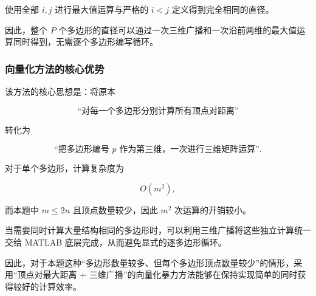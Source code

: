 使用全部 $i,j$ 进行最大值运算与严格的 $i<j$ 定义得到完全相同的直径。

因此，整个 $P$ 个多边形的直径可以通过一次三维广播和一次沿前两维的最大值运算同时得到，无需逐个多边形编写循环。

\subsubsection{向量化方法的核心优势}

该方法的核心思想是：将原本

$$
\text{“对每一个多边形分别计算所有顶点对距离”}
$$

转化为

$$
\text{“把多边形编号 }p\text{ 作为第三维，一次进行三维矩阵运算”}.
$$

对于单个多边形，计算复杂度为

\begin{equation}
O(m^2),
\end{equation}

而本题中 $m\leq2n$ 且顶点数量较少，因此 $m^2$ 次运算的开销较小。

当需要同时计算大量结构相同的多边形时，可以利用三维广播将这些独立计算统一交给 MATLAB 底层完成，从而避免显式的逐多边形循环。

因此，对于本题这种“多边形数量较多、但每个多边形顶点数量较少”的情形，采用“顶点对最大距离 + 三维广播”的向量化暴力方法能够在保持实现简单的同时获得较好的计算效率。
